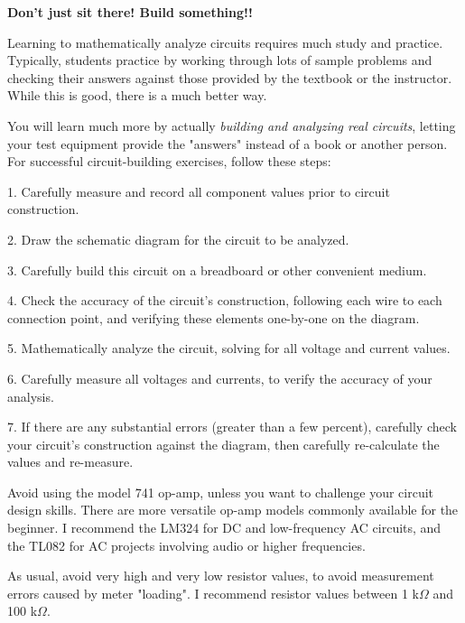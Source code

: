 

\centerline{\bf Don't just sit there!  Build something!!}

\vskip 10pt

Learning to mathematically analyze circuits requires much study and practice.  Typically, students practice by working through lots of sample problems and checking their answers against those provided by the textbook or the instructor.  While this is good, there is a much better way.

You will learn much more by actually {\it building and analyzing real circuits}, letting your test equipment provide the "answers" instead of a book or another person.  For successful circuit-building exercises, follow these steps:

\medskip
\item{1.} Carefully measure and record all component values prior to circuit construction.
\item{2.} Draw the schematic diagram for the circuit to be analyzed.
\item{3.} Carefully build this circuit on a breadboard or other convenient medium.
\item{4.} Check the accuracy of the circuit's construction, following each wire to each connection point, and verifying these elements one-by-one on the diagram.
\item{5.} Mathematically analyze the circuit, solving for all voltage and current values.
\item{6.} Carefully measure all voltages and currents, to verify the accuracy of your analysis.
\item{7.} If there are any substantial errors (greater than a few percent), carefully check your circuit's construction against the diagram, then carefully re-calculate the values and re-measure.
\medskip

Avoid using the model 741 op-amp, unless you want to challenge your circuit design skills.  There are more versatile op-amp models commonly available for the beginner.  I recommend the LM324 for DC and low-frequency AC circuits, and the TL082 for AC projects involving audio or higher frequencies.

As usual, avoid very high and very low resistor values, to avoid measurement errors caused by meter "loading".  I recommend resistor values between 1 k$\Omega$ and 100 k$\Omega$.

